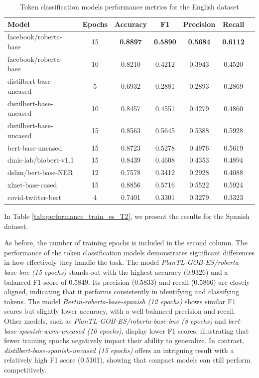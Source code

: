 \documentclass{Configuration_Files/PoliMi3i_thesis}
\begin{document}
\begin{table}[H]
    \centering
    \begin{tabular}{lcccccc}
        \hline
        \textbf{Model} & \textbf{Epochs} & \textbf{Accuracy} & \textbf{F1} & \textbf{Precision} & \textbf{Recall} \\
        \hline
        facebook/roberta-base & 15 & \textbf{0.8897} & \textbf{0.5890} & \textbf{0.5684} & \textbf{0.6112} \\
        facebook/roberta-base & 10 & 0.8210 & 0.4212 & 0.3943 & 0.4520 \\
        distilbert-base-uncased & 5 & 0.6932 & 0.2881 & 0.2893 & 0.2869 \\  
        distilbert-base-uncased & 10 & 0.8457 & 0.4551 & 0.4279 & 0.4860 \\  
        distilbert-base-uncased & 15 & 0.8563 & 0.5645 & 0.5388 & 0.5928 \\  
        bert-base-uncased & 15 & 0.8723 & 0.5278 & 0.4976 & 0.5619 \\  
        dmis-lab/biobert-v1.1 & 15 & 0.8439 & 0.4608 & 0.4353 & 0.4894 \\  
        dslim/bert-base-NER & 12 & 0.7578 & 0.3412 & 0.2928 & 0.4088 \\
        xlnet-base-cased & 15 & 0.8856 & 0.5716 & 0.5522 & 0.5924 \\
        covid-twitter-bert & 4 & 0.7401 & 0.3301 & 0.3279 & 0.3323 \\
        \hline 
    \end{tabular}
    \caption{\small Token classification models performance metrics for the English dataset}
    \label{tab:performance_train_en_T2}
\end{table}

In Table \ref{tab:performance_train_es_T2}, we present the results for the Spanish dataset. 

As before, the number of training epochs is included in the second column. The performance of the token classification models demonstrates significant differences in how effectively they handle the task. The model \textit{PlanTL-GOB-ES/roberta-base-bne (15 epochs)} stands out with the highest accuracy (0.9326) and a balanced F1 score of 0.5849. Its precision (0.5833) and recall (0.5866) are closely aligned, indicating that it performs consistently in identifying and classifying tokens. The model \textit{Bertin-roberta-base-spanish (12 epochs)} shows similar F1 scores but slightly lower accuracy, with a well-balanced precision and recall. Other models, such as \textit{PlanTL-GOB-ES/roberta-base-bne (8 epochs)} and \textit{bert-base-spanish-wwm-uncased (10 epochs)}, display lower F1 scores, illustrating that fewer training epochs negatively impact their ability to generalize. In contrast, \textit{distilbert-base-spanish-uncased (15 epochs)} offers an intriguing result with a relatively high F1 score (0.5101), showing that compact models can still perform competitively. 
\end{document}
